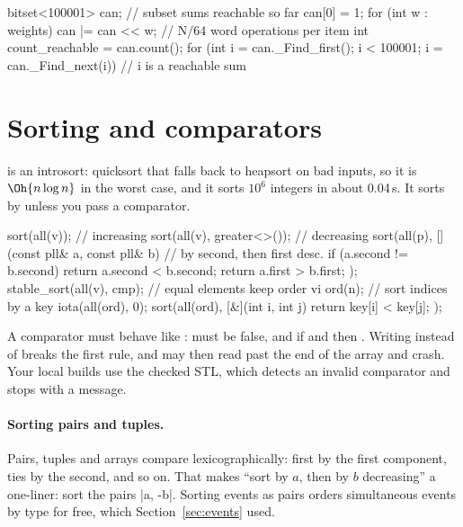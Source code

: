 \begin{code}
bitset<100001> can;                     // subset sums reachable so far
can[0] = 1;
for (int w : weights) can |= can << w;  // N/64 word operations per item
int count_reachable = can.count();
for (int i = can._Find_first(); i < 100001; i = can._Find_next(i)) {
    // i is a reachable sum
}
\end{code}

\section[Sorting and comparators]{Sorting and comparators \hfill \silver}\label{sec:sorting-stl}

 is an introsort: quicksort that falls back to heapsort on bad inputs, so it is $\Oh{n\log n}$ in the worst
case, and it sorts $10^6$ integers in about 0.04\,s. It sorts by  unless you pass a comparator.

\begin{code}
sort(all(v));                                    // increasing
sort(all(v), greater<>());                       // decreasing
sort(all(p), [](const pll& a, const pll& b) {    // by second, then first desc.
    if (a.second != b.second) return a.second < b.second;
    return a.first > b.first;
});
stable_sort(all(v), cmp);                        // equal elements keep order
vi ord(n);                                       // sort indices by a key
iota(all(ord), 0);
sort(all(ord), [&](int i, int j) { return key[i] < key[j]; });
\end{code}

\begin{pitfall}
A comparator must behave like \cc{<}:  must be false, and if  and  then
. Writing \cc{<=} instead of \cc{<} breaks the first rule, and  may then read past the end of the
array and crash. Your local builds use the checked STL, which detects an invalid comparator and stops with a message.
\end{pitfall}

\paragraph{Sorting pairs and tuples.} Pairs, tuples and arrays compare lexicographically: first by the first component, ties
by the second, and so on. That makes ``sort by $a$, then by $b$ decreasing'' a one-liner: sort the pairs
\cc|{a, -b}|. Sorting
events as  pairs orders simultaneous events by type for free, which Section~\ref{sec:events} used.

